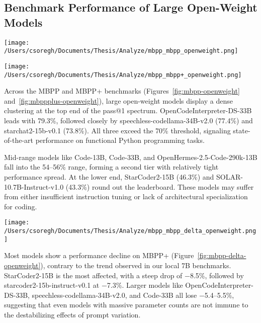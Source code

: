\subsection{Benchmark Performance of Large Open-Weight Models}

\begin{center}
	\texttt{[image: /Users/csoregh/Documents/Thesis/Analyze/mbpp\_mbpp\_openweight.png]}
	\label{fig:mbpp-openweight}
\end{center}

\begin{center}
	\texttt{[image: /Users/csoregh/Documents/Thesis/Analyze/mbpp\_mbpp+\_openweight.png]}
	\label{fig:mbppplus-openweight}
\end{center}

Across the MBPP and MBPP+ benchmarks (Figures~\ref{fig:mbpp-openweight} and~\ref{fig:mbppplus-openweight}), large open-weight models display a dense clustering at the top end of the pass@1 spectrum. OpenCodeInterpreter-DS-33B leads with 79.3\%, followed closely by speechless-codellama-34B-v2.0 (77.4\%) and starchat2-15b-v0.1 (73.8\%). All three exceed the 70\% threshold, signaling state-of-the-art performance on functional Python programming tasks.

Mid-range models like Code-13B, Code-33B, and OpenHermes-2.5-Code-290k-13B fall into the 54--56\% range, forming a second tier with relatively tight performance spread. At the lower end, StarCoder2-15B (46.3\%) and SOLAR-10.7B-Instruct-v1.0 (43.3\%) round out the leaderboard. These models may suffer from either insufficient instruction tuning or lack of architectural specialization for coding.

\begin{center}
	\texttt{[image: /Users/csoregh/Documents/Thesis/Analyze/mbpp\_mbpp\_delta\_openweight.png]}
	\label{fig:mbpp-delta-openweight}
\end{center}

Most models show a performance decline on MBPP+ (Figure~\ref{fig:mbpp-delta-openweight}), contrary to the trend observed in our local 7B benchmarks. StarCoder2-15B is the most affected, with a steep drop of −8.5\%, followed by starcoder2-15b-instruct-v0.1 at −7.3\%. Larger models like OpenCodeInterpreter-DS-33B, speechless-codellama-34B-v2.0, and Code-33B all lose −5.4--5.5\%, suggesting that even models with massive parameter counts are not immune to the destabilizing effects of prompt variation.

